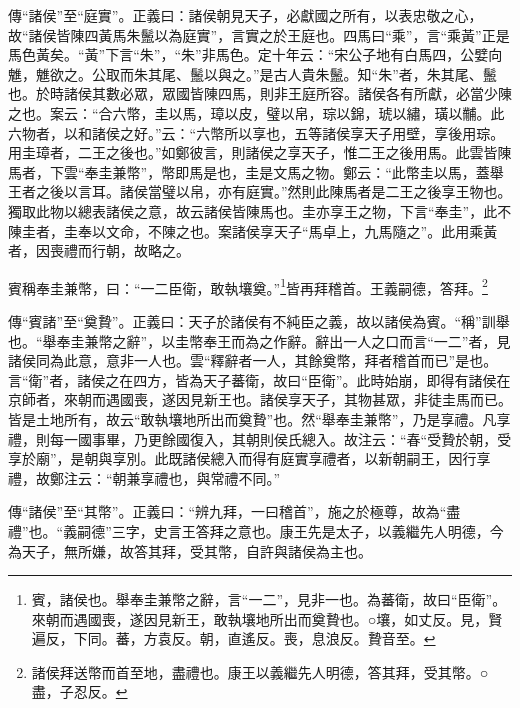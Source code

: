 {\noindent\zhuan{}\fzbyks 傳“諸侯”至“庭實”。正義曰：諸侯朝見天子，必獻國之所有，以表忠敬之心，故“諸侯皆陳四黃馬朱鬛以為庭實”，言實之於王庭也。四馬曰“乘”，言“乘黃”正是馬色黃矣。“黃”下言“朱”，“朱”非馬色。定十年云：“宋公子地有白馬四，公嬖向魋，魋欲之。公取而朱其尾、鬛以與之。”是古人貴朱鬛。知“朱”者，朱其尾、鬛也。於時諸侯其數必眾，眾國皆陳四馬，則非王庭所容。諸侯各有所獻，必當少陳之也。案云：“合六幣，圭以馬，璋以皮，璧以帛，琮以錦，琥以繡，璜以黼。此六物者，以和諸侯之好。”云：“六幣所以享也，五等諸侯享天子用壁，享後用琮。用圭璋者，二王之後也。”如鄭彼言，則諸侯之享天子，惟二王之後用馬。此雲皆陳馬者，下雲“奉圭兼幣”，幣即馬是也，圭是文馬之物。鄭云：“此幣圭以馬，蓋舉王者之後以言耳。諸侯當璧以帛，亦有庭實。”然則此陳馬者是二王之後享王物也。獨取此物以總表諸侯之意，故云諸侯皆陳馬也。圭亦享王之物，下言“奉圭”，此不陳圭者，圭奉以文命，不陳之也。案諸侯享天子“馬卓上，九馬隨之”。此用乘黃者，因喪禮而行朝，故略之。 \par}

賓稱奉圭兼幣，曰：“一二臣衛，敢執壤奠。”\footnote{賓，諸侯也。舉奉圭兼幣之辭，言“一二”，見非一也。為蕃衛，故曰“臣衛”。來朝而遇國喪，遂因見新王，敢執壤地所出而奠贄也。○壤，如丈反。見，賢遍反，下同。蕃，方袁反。朝，直遙反。喪，息浪反。贄音至。}皆再拜稽首。王義嗣德，答拜。\footnote{諸侯拜送幣而首至地，盡禮也。康王以義繼先人明德，答其拜，受其幣。○盡，子忍反。}

{\noindent\zhuan{}\fzbyks 傳“賓諸”至“奠贄”。正義曰：天子於諸侯有不純臣之義，故以諸侯為賓。“稱”訓舉也。“舉奉圭兼幣之辭”，以圭幣奉王而為之作辭。辭出一人之口而言“一二”者，見諸侯同為此意，意非一人也。雲“釋辭者一人，其餘奠幣，拜者稽首而已”是也。言“衛”者，諸侯之在四方，皆為天子蕃衛，故曰“臣衛”。此時始崩，即得有諸侯在京師者，來朝而遇國喪，遂因見新王也。諸侯享天子，其物甚眾，非徒圭馬而已。皆是土地所有，故云“敢執壤地所出而奠贄”也。然“舉奉圭兼幣”，乃是享禮。凡享禮，則每一國事畢，乃更餘國復入，其朝則侯氏總入。故注云：“春“受贄於朝，受享於廟”，是朝與享別。此既諸侯總入而得有庭實享禮者，以新朝嗣王，因行享禮，故鄭注云：“朝兼享禮也，與常禮不同。” \par}

{\noindent\zhuan{}\fzbyks 傳“諸侯”至“其幣”。正義曰：“辨九拜，一曰稽首”，施之於極尊，故為“盡禮”也。“義嗣德”三字，史言王答拜之意也。康王先是太子，以義繼先人明德，今為天子，無所嫌，故答其拜，受其幣，自許與諸侯為主也。 \par}

